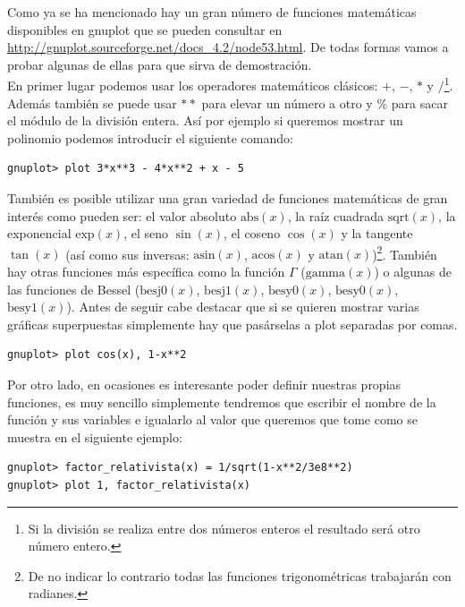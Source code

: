 \documentclass[11pt,a4paper,twoside,pdf]{article}
\numberwithin{equation}{section}
\begin{document}
Como ya se ha mencionado hay un gran número de funciones matemáticas disponibles en gnuplot que se pueden consultar en \url{http://gnuplot.sourceforge.net/docs_4.2/node53.html}. De todas formas vamos a probar algunas de ellas para que sirva de demostración. \\

En primer lugar podemos usar los operadores matemáticos clásicos: $+$, $-$, $*$ y $/$\footnote{Si la división se realiza entre dos números enteros el resultado será otro número entero.}. Además también se puede usar $**$ para elevar un número a otro y $\%$ para sacar el módulo de la división entera. Así por ejemplo si queremos mostrar un polinomio podemos introducir el siguiente comando:

\begin{lstlisting}[language=Gnuplot]
gnuplot> plot 3*x**3 - 4*x**2 + x - 5
\end{lstlisting}

También es posible utilizar una gran variedad de funciones matemáticas de gran interés como pueden ser: el valor absoluto $\text{abs}(x)$, la raíz cuadrada $\text{sqrt}(x)$, la exponencial $\text{exp}(x)$, el seno $\sin(x)$, el coseno $\cos(x)$ y la tangente $\tan(x)$ (así como sus inversas: $\text{asin}(x)$, $\text{acos}(x)$ y $\text{atan}(x)$)\footnote{De no indicar lo contrario todas las funciones trigonométricas trabajarán con radianes.}. También hay otras funciones más específica como la función $\Gamma$ ($\text{gamma}(x)$) o algunas de las funciones de Bessel ($\text{besj0}(x)$, $\text{besj1}(x)$, $\text{besy0}(x)$, $\text{besy0}(x)$, $\text{besy1}(x)$). Antes de seguir cabe destacar que si se quieren mostrar varias gráficas superpuestas simplemente hay que pasárselas a plot separadas por comas.

\begin{lstlisting}[language=Gnuplot]
gnuplot> plot cos(x), 1-x**2
\end{lstlisting}

Por otro lado, en ocasiones es interesante poder definir nuestras propias funciones, es muy sencillo simplemente tendremos que escribir el nombre de la función y sus variables e igualarlo al valor que queremos que tome como se muestra en el siguiente ejemplo:

\begin{lstlisting}[language=Gnuplot]
gnuplot> factor_relativista(x) = 1/sqrt(1-x**2/3e8**2)
gnuplot> plot 1, factor_relativista(x)
\end{lstlisting}
\end{document}
